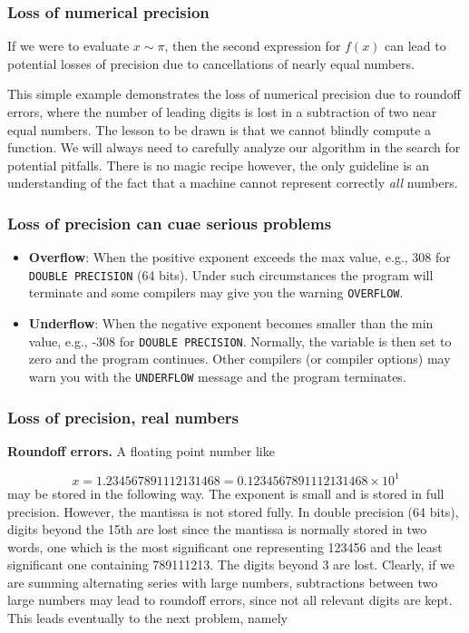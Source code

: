 \documentclass[handout]{beamer}
\newenvironment{block_mdfboxadmon}[1][]{\begin{block}{#1}}{\end{block}}
\begin{document}
\begin{frame}
\frametitle{Loss of numerical precision}

If we were to evaluate $x\sim \pi$, then the second expression for $f(x)$
can lead to potential losses of precision due to cancellations of nearly
equal numbers.

This simple example demonstrates  the loss of numerical precision due
to roundoff errors, where the number of leading digits is lost
in a subtraction of two near equal numbers.
The lesson to be drawn is that we cannot blindly compute a function.
We will always need to carefully analyze our algorithm in the search for
potential pitfalls. There is no magic recipe however, the only guideline
is an understanding of the fact that a machine cannot represent
correctly \emph{all} numbers.
\end{frame}

\begin{frame}
\frametitle{Loss of precision can cuae serious problems}

\begin{block_mdfboxadmon}

\begin{itemize}
  \item \textbf{Overflow}: When the positive exponent exceeds the max value, e.g., 308 for \Verb!DOUBLE PRECISION! (64 bits). Under such circumstances the program will terminate and some compilers may give you the warning \Verb!OVERFLOW!.

  \item \textbf{Underflow}: When the negative exponent becomes smaller than the min value, e.g., -308 for \Verb!DOUBLE PRECISION!. Normally, the variable is then set to zero and the program continues. Other compilers (or compiler options) may warn you with the \Verb!UNDERFLOW! message and the program terminates.
\end{itemize}

\noindent
\end{block_mdfboxadmon}
\end{frame}

\begin{frame}
\frametitle{Loss of precision, real numbers}

\noindent\textbf{Roundoff errors.}
A floating point number like

\begin{equation}
   x= 1.234567891112131468 = 0.1234567891112131468\times 10^{1}
\end{equation}
may be stored in the following way. The exponent is  small
and is stored in full precision. However,
the mantissa is not stored fully. In double precision (64 bits), digits
beyond the
15th are lost since the mantissa is normally stored in two words,
one which is the most significant one representing
123456 and the least significant one containing 789111213. The digits
beyond 3 are lost. Clearly, if we are summing alternating series
with large numbers, subtractions between two large numbers may lead
to roundoff errors, since not all relevant digits are kept.
This leads eventually to the next problem, namely
\end{frame}
\end{document}
